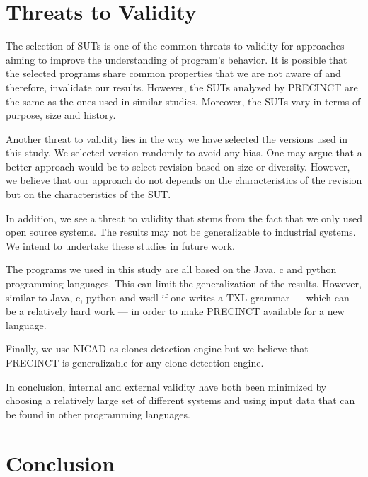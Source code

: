 \documentclass[conference]{IEEEtran}
\begin{document}
\section{Threats to Validity}
\label{sec:Threats to Validity}

The selection of SUTs is one of the common threats to validity for approaches aiming to improve the understanding of program's behavior.
It is possible that the selected programs share common properties that we are not aware of and therefore, invalidate our results.
However, the SUTs analyzed by PRECINCT are the same as the ones used in similar studies.
Moreover, the SUTs vary in terms of purpose, size and history.

Another threat to validity lies in the way we have selected the versions used in this study.
We selected version randomly to avoid any bias.
One may argue that a better approach would be to select revision based on size or diversity.
However, we believe that our approach do not depends on the characteristics of the revision but on the characteristics of the SUT.

In addition, we see a threat to validity that stems from the fact that we only used open source systems. The results may not be generalizable to industrial systems. We intend to undertake these studies in future work.

The programs we used in this study are all based on the Java, c and python programming languages. This can limit the generalization of the results. However, similar to Java, c, python and wsdl if one writes a TXL grammar --- which can be a relatively hard work --- in order to make PRECINCT available for a new language.

Finally, we use NICAD as clones detection engine but we believe that PRECINCT is generalizable for any clone detection engine.

In conclusion, internal and external validity have both been minimized by choosing a relatively large set of different systems and using input data that can be found in other programming languages.



\section{Conclusion}
\label{sec:Conclusion}









\end{document}
